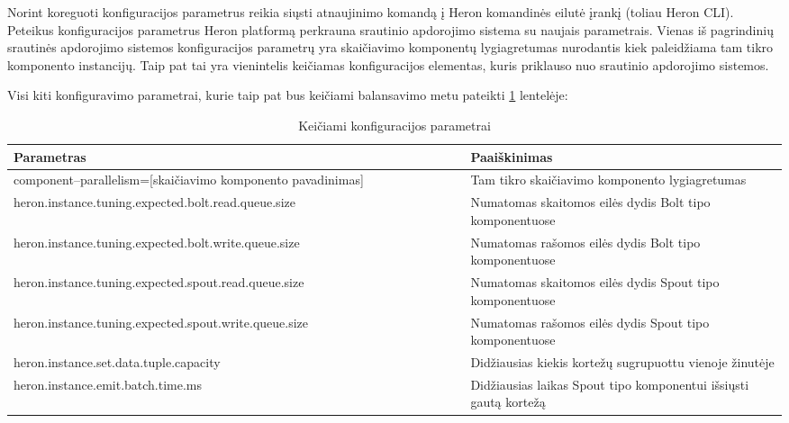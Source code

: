 \documentclass{VUMIFPSbakalaurinis}
\begin{document}
Norint koreguoti konfiguracijos parametrus reikia siųsti atnaujinimo komandą į Heron komandinės eilutė įrankį (toliau Heron CLI). Peteikus konfiguracijos parametrus Heron platformą perkrauna srautinio apdorojimo sistema su naujais parametrais. 
Vienas iš pagrindinių srautinės apdorojimo sistemos konfiguracijos parametrų yra skaičiavimo komponentų lygiagretumas nurodantis kiek paleidžiama tam tikro komponento instancijų. Taip pat tai yra vienintelis keičiamas konfiguracijos elementas, kuris priklauso nuo srautinio apdorojimo sistemos.


Visi kiti konfiguravimo parametrai, kurie taip pat bus keičiami balansavimo metu pateikti \ref{param–table} lentelėje:

\begin{longtable}{|p{0.59\linewidth}|p{0.41\linewidth}|}
    \caption{Keičiami konfiguracijos parametrai}
    \label{param–table}\\
    \hline
    \rowcolor[HTML]{C0C0C0} 
    Parametras                                              & Paaiškinimas                                                                                 \\ \hline
    \endfirsthead
    \endhead
    component–parallelism=[skaičiavimo komponento pavadinimas]            & Tam tikro skaičiavimo komponento lygiagretumas                                 \\ \hline
    heron.instance.tuning.expected.bolt.read.queue.size                   & Numatomas skaitomos eilės dydis Bolt tipo komponentuose                        \\ \hline
    heron.instance.tuning.expected.bolt.write.queue.size                  & Numatomas rašomos eilės dydis Bolt tipo komponentuose                          \\ \hline
    heron.instance.tuning.expected.spout.read.queue.size                  & Numatomas skaitomos eilės dydis Spout tipo komponentuose                       \\ \hline
    heron.instance.tuning.expected.spout.write.queue.size                 & Numatomas rašomos eilės dydis Spout tipo komponentuose                         \\ \hline
    heron.instance.set.data.tuple.capacity                                & Didžiausias kiekis kortežų sugrupuottu vienoje žinutėje                        \\ \hline
    heron.instance.emit.batch.time.ms                                     & Didžiausias laikas Spout tipo komponentui išsiųsti gautą kortežą               \\ \hline

\end{longtable}
\end{document}
